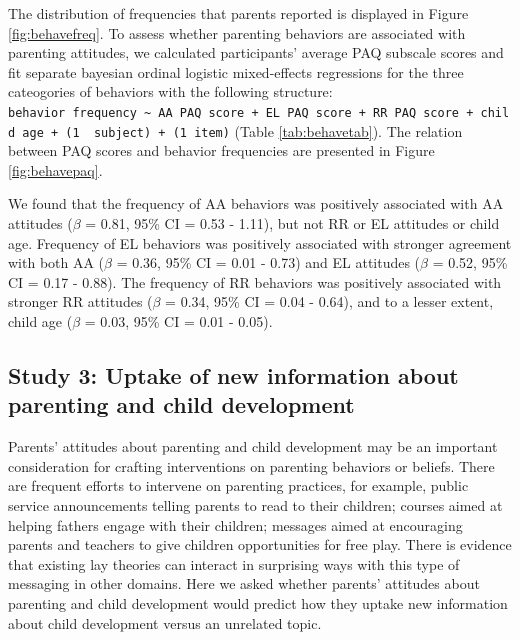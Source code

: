 \documentclass[man]{apa6}
\theoremstyle{definition}
\theoremstyle{definition}
\theoremstyle{definition}
\theoremstyle{remark}
\begin{document}
The distribution of frequencies that parents reported is displayed in
Figure \ref{fig:behavefreq}. To assess whether parenting behaviors are
associated with parenting attitudes, we calculated participants' average
PAQ subscale scores and fit separate bayesian ordinal logistic
mixed-effects regressions for the three cateogories of behaviors with
the following structure:
\texttt{behavior\ frequency\ \textasciitilde{}\ AA\ PAQ\ score\ +\ EL\ PAQ\ score\ +\ RR\ PAQ\ score\ +\ child\ age\ +\ (1\ \textbar{}\ subject)\ +\ (1\textbar{}\ item)}
(Table \ref{tab:behavetab}). The relation between PAQ scores and
behavior frequencies are presented in Figure \ref{fig:behavepaq}.

We found that the frequency of AA behaviors was positively associated
with AA attitudes (\(\beta\) = 0.81, 95\% CI = 0.53 - 1.11), but not RR
or EL attitudes or child age. Frequency of EL behaviors was positively
associated with stronger agreement with both AA (\(\beta\) = 0.36, 95\%
CI = 0.01 - 0.73) and EL attitudes (\(\beta\) = 0.52, 95\% CI = 0.17 -
0.88). The frequency of RR behaviors was positively associated with
stronger RR attitudes (\(\beta\) = 0.34, 95\% CI = 0.04 - 0.64), and to
a lesser extent, child age (\(\beta\) = 0.03, 95\% CI = 0.01 - 0.05).

\subsection{Study 3: Uptake of new information about parenting and child
development}\label{study-3-uptake-of-new-information-about-parenting-and-child-development}

Parents' attitudes about parenting and child development may be an
important consideration for crafting interventions on parenting
behaviors or beliefs. There are frequent efforts to intervene on
parenting practices, for example, public service announcements telling
parents to read to their children; courses aimed at helping fathers
engage with their children; messages aimed at encouraging parents and
teachers to give children opportunities for free play. There is evidence
that existing lay theories can interact in surprising ways with this
type of messaging in other domains. Here we asked whether parents'
attitudes about parenting and child development would predict how they
uptake new information about child development versus an unrelated
topic.
\end{document}
